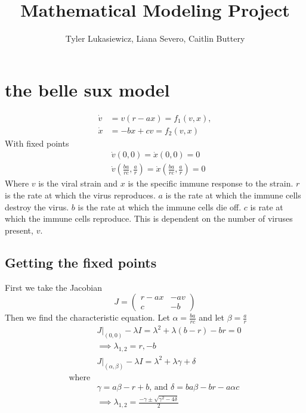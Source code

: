 \documentclass{article}
\title{Mathematical Modeling Project}
\author{Tyler Lukasiewicz, Liana Severo, Caitlin Buttery}
\begin{document}
\maketitle
\section{the belle sux model}
\begin{equation}
    \begin{split}
        \dot v &= v(r-ax) = f_1(v,x), \\
        \dot x &= -bx + cv = f_2(v,x)
    \end{split}
\end{equation}
With fixed points 
\begin{equation}
    \begin{split}
        &\dot v(0,0) =  \dot x(0,0) = 0 \\
        &\dot v(\frac{ba}{rc} ,\frac{a}{r} ) = \dot x(\frac{ba}{rc} ,\frac{a}{r} ) = 0
    \end{split}
\end{equation}
Where $v$ is the viral strain and $x$ is the specific immune response to the strain. $r$ is the rate at which the virus reproduces. $a$ is the rate at which the immune cells destroy the virus. $b$ is the rate at which the immune cells die off. $c$ is rate at which the immune cells reproduce. This is dependent on the number of viruses present, $v$.  
\subsection{Getting the fixed points}
First we take the Jacobian
\begin{equation}
    J =
    \begin{pmatrix}
        r-ax    & -av \\
        c       & -b
    \end{pmatrix}
\end{equation}
Then we find the characteristic equation. Let $\alpha = \frac{ba}{rc} $ and let $\beta = \frac{a}{r} $
\begin{equation}
    \begin{split}
        &J|_{(0,0)} - \lambda I = \lambda^2 + \lambda(b-r) -br = 0\\
        &\implies \lambda_{1,2} = r, -b \\
        &J|_{(\alpha,\beta)}  - \lambda I =  \lambda^2 + \lambda \gamma + \delta\\ 
        \text{where} \\
        &\gamma =  a\beta-r+b \text{, and } \delta =ba\beta -br-a\alpha c \\
        &\implies \lambda_{1,2} = \frac{-\gamma \pm \sqrt{\gamma^2 - 4\delta}}{2} 
    \end{split}
\end{equation}
\end{document}

